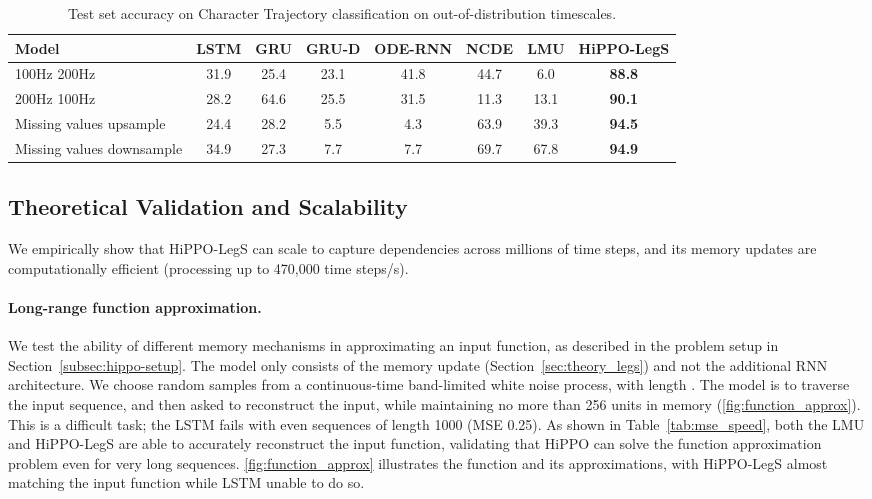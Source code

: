 \documentclass{article}
\begin{document}
\begin{table}[ht]
    \small
    \centering
    \caption{Test set accuracy on Character Trajectory classification on out-of-distribution timescales.   }
    \begin{tabular}{lccccccc}
        \toprule
        Model                     & \textbf{LSTM} & \textbf{GRU} & \textbf{GRU-D} & \textbf{ODE-RNN} & \textbf{NCDE} & \textbf{LMU} & \textbf{HiPPO-LegS} \\
        \midrule
        100Hz  200Hz         & 31.9          & 25.4         & 23.1           & 41.8             & 44.7          & 6.0          & \textbf{88.8}       \\
        200Hz  100Hz         & 28.2          & 64.6         & 25.5           & 31.5             & 11.3          & 13.1         & \textbf{90.1}       \\
        \midrule
        Missing values upsample   & 24.4          & 28.2         & 5.5            & 4.3              & 63.9          & 39.3         & \textbf{94.5}       \\
        Missing values downsample & 34.9          & 27.3         & 7.7            & 7.7              & 69.7          & 67.8         & \textbf{94.9}       \\
        \bottomrule
    \end{tabular}
    \label{tab:charactertrajectories}
\end{table}




\subsection{Theoretical Validation and Scalability}
\label{subsec:exp-scalability}

We empirically show that HiPPO-LegS can scale to capture dependencies
across millions of time steps, and its memory updates are computationally
efficient (processing up to 470,000 time steps/s).

\paragraph{Long-range function approximation.}
We test the ability of
different memory mechanisms in approximating an input function, as described in
the problem setup in Section~\ref{subsec:hippo-setup}.
The model only consists of the memory update (Section~\ref{sec:theory_legs}) and
not the additional RNN architecture.
We choose random samples from a continuous-time band-limited white noise
process, with length .
The model is to traverse the input sequence, and then asked to reconstruct the
input, while maintaining no more than 256 units in memory (\cref{fig:function_approx}).
This is a difficult task; the LSTM fails with even sequences of length 1000 (MSE
 0.25).
As shown in Table~\ref{tab:mse_speed}, both the LMU and HiPPO-LegS are able to
accurately reconstruct the input function, validating that HiPPO can solve the
function approximation problem even for very long sequences.
\cref{fig:function_approx} illustrates the function and its approximations, with
HiPPO-LegS almost matching the input function while LSTM unable to do so.
\end{document}
